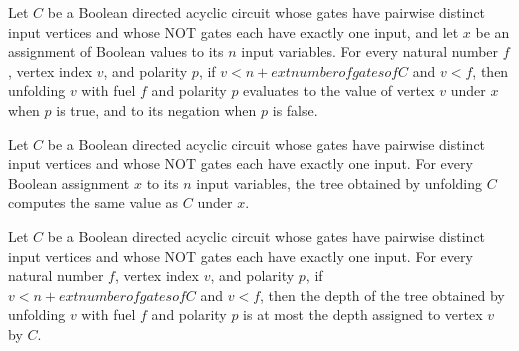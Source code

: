 \begin{theorem}
\label{BoolCircuit.DAGCircuit.unfoldVertex_eval}
\leanok
{}
Let $C$ be a Boolean directed acyclic circuit whose gates have pairwise distinct input
vertices and whose NOT gates each have exactly one input, and let $x$ be an assignment
of Boolean values to its $n$ input variables. For every natural number $f$, vertex index
$v$, and polarity $p$, if $v<n+	ext{number of gates of }C$ and $v<f$, then unfolding $v$
with fuel $f$ and polarity $p$ evaluates to the value of vertex $v$ under $x$ when $p$
is true, and to its negation when $p$ is false.
\end{theorem}

\begin{theorem}
\label{BoolCircuit.DAGCircuit.toTree_eval}
\leanok
{}
Let $C$ be a Boolean directed acyclic circuit whose gates have pairwise distinct input
vertices and whose NOT gates each have exactly one input. For every Boolean assignment
$x$ to its $n$ input variables, the tree obtained by unfolding $C$ computes the same
value as $C$ under $x$.
\end{theorem}

\begin{theorem}
\label{BoolCircuit.DAGCircuit.unfoldVertex_depth_le}
\leanok
{}
Let $C$ be a Boolean directed acyclic circuit whose gates have pairwise distinct input
vertices and whose NOT gates each have exactly one input. For every natural number $f$,
vertex index $v$, and polarity $p$, if $v<n+	ext{number of gates of }C$ and $v<f$, then
the depth of the tree obtained by unfolding $v$ with fuel $f$ and polarity $p$ is at
most the depth assigned to vertex $v$ by $C$.
\end{theorem}

